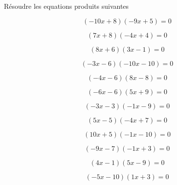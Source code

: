  Résoudre les equations produits suivantes

\begin{multicols}{4}
$$(-10x+8)(-9x+5)=0$$

$$( 7x+8)(-4x+4)=0$$

$$( 8x+6)( 3x-1)=0$$

$$(-3x-6)(-10x-10)=0$$

$$(-4x-6)( 8x-8)=0$$

$$(-6x-6)( 5x+9)=0$$

$$(-3x-3)(-1x-9)=0$$

$$( 5x-5)(-4x+7)=0$$

$$( 10x+5)(-1x-10)=0$$

$$(-9x-7)(-1x+3)=0$$

$$( 4x-1)( 5x-9)=0$$

$$(-5x-10)( 1x+3)=0$$

\end{multicols}